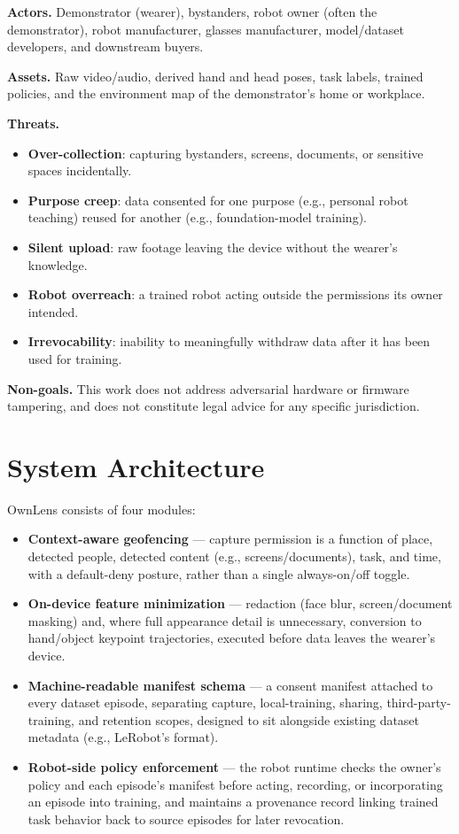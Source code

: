 \documentclass[10pt,twocolumn,letterpaper]{article}
\begin{document}
\textbf{Actors.} Demonstrator (wearer), bystanders, robot owner (often the demonstrator), robot manufacturer, glasses manufacturer, model/dataset developers, and downstream buyers.

\textbf{Assets.} Raw video/audio, derived hand and head poses, task labels, trained policies, and the environment map of the demonstrator's home or workplace.

\textbf{Threats.}
\begin{itemize}
  \item \textbf{Over-collection}: capturing bystanders, screens, documents, or sensitive spaces incidentally.
  \item \textbf{Purpose creep}: data consented for one purpose (e.g., personal robot teaching) reused for another (e.g., foundation-model training).
  \item \textbf{Silent upload}: raw footage leaving the device without the wearer's knowledge.
  \item \textbf{Robot overreach}: a trained robot acting outside the permissions its owner intended.
  \item \textbf{Irrevocability}: inability to meaningfully withdraw data after it has been used for training.
\end{itemize}

\textbf{Non-goals.} This work does not address adversarial hardware or firmware tampering, and does not constitute legal advice for any specific jurisdiction.

\section{System Architecture}

OwnLens consists of four modules:

\begin{itemize}
  \item \textbf{Context-aware geofencing} — capture permission is a function of place, detected people, detected content (e.g., screens/documents), task, and time, with a default-deny posture, rather than a single always-on/off toggle.
  \item \textbf{On-device feature minimization} — redaction (face blur, screen/document masking) and, where full appearance detail is unnecessary, conversion to hand/object keypoint trajectories, executed before data leaves the wearer's device.
  \item \textbf{Machine-readable manifest schema} — a consent manifest attached to every dataset episode, separating capture, local-training, sharing, third-party-training, and retention scopes, designed to sit alongside existing dataset metadata (e.g., LeRobot's format).
  \item \textbf{Robot-side policy enforcement} — the robot runtime checks the owner's policy and each episode's manifest before acting, recording, or incorporating an episode into training, and maintains a provenance record linking trained task behavior back to source episodes for later revocation.
\end{itemize}
\end{document}
